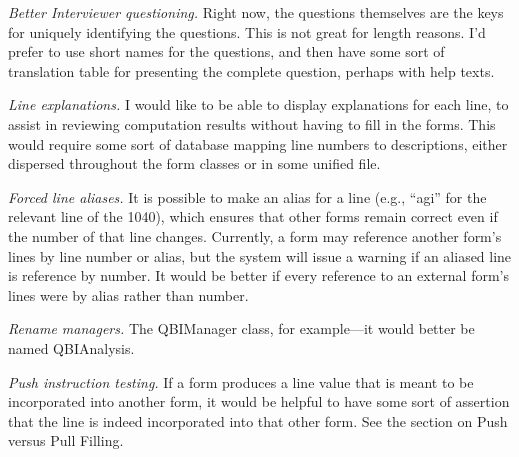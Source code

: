 \emph{Better Interviewer questioning.} Right now, the questions themselves are
the keys for uniquely identifying the questions. This is not great for length
reasons. I'd prefer to use short names for the questions, and then have some
sort of translation table for presenting the complete question, perhaps with
help texts.

\emph{Line explanations.} I would like to be able to display explanations for
each line, to assist in reviewing computation results without having to fill in
the forms. This would require some sort of database mapping line numbers to
descriptions, either dispersed throughout the form classes or in some unified
file.

\emph{Forced line aliases.} It is possible to make an alias for a line (e.g.,
``agi'' for the relevant line of the 1040), which ensures that other forms
remain correct even if the number of that line changes. Currently, a form may
reference another form's lines by line number or alias, but the system will
issue a warning if an aliased line is reference by number. It would be better if
every reference to an external form's lines were by alias rather than number.

\emph{Rename managers.} The QBIManager class, for example---it would better be
named QBIAnalysis.

\emph{Push instruction testing.} If a form produces a line value that is meant
to be incorporated into another form, it would be helpful to have some sort of
assertion that the line is indeed incorporated into that other form. See the
section on Push versus Pull Filling.
